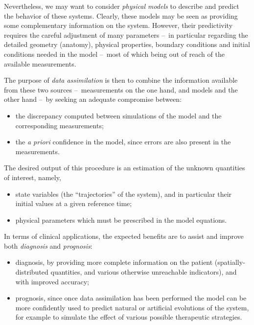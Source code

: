 \documentclass{tufte-book}
\begin{document}
Nevertheless, we may want to consider \emph{physical models} to describe and predict the behavior of these systems. Clearly, these models may be seen as providing some complementary information on the system. However, their predictivity requires the careful adjustment of many parameters --~in particular regarding the detailed geometry (anatomy), physical properties, boundary conditions and initial conditions needed in the model --~most of which being out of reach of the available measurements.

The purpose of \emph{data assimilation} is then to combine the information available from these two sources --~measurements on the one hand, and models and the other hand --~by seeking an adequate compromise between:
\begin{itemize}
	\item the discrepancy computed between simulations of the model and the corresponding measurements;
	\item the \emph{a priori} confidence in the model, since errors are also present in the measurements.
\end{itemize}
The desired output of this procedure is an estimation of the unknown quantities of interest, namely,
\begin{itemize}
	\item state variables (the ``trajectories'' of the system), and in particular their initial values at a given reference time;
	\item physical parameters which must be prescribed in the model equations.
\end{itemize}
In terms of clinical applications, the expected benefits are to assist and improve both \emph{diagnosis} and \emph{prognosis}:
\begin{itemize}
	\item diagnosis, by providing more complete information on the patient (spatially-distributed quantities, and various otherwise unreachable indicators), and with improved accuracy;
	\item prognosis, since once data assimilation has been performed the model can be more confidently used to predict natural or artificial evolutions of the system, for example to simulate the effect of various possible therapeutic strategies.
\end{itemize}
\end{document}
